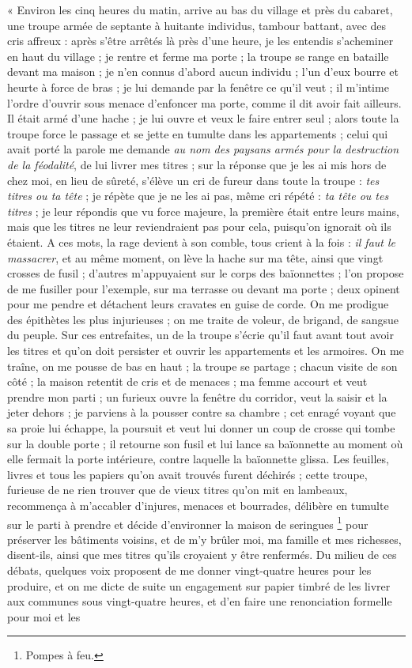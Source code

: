 \documentclass[french,twoside]{book} %
\newenvironment{quoteblock}%
  {\begin{quoting}}
  {\end{quoting}}
\newenvironment{quotebar}{%
    \def\FrameCommand{{\color{rubric!10!}\vrule width 0.5em} \hspace{0.9em}}%
    \def\OuterFrameSep{\itemsep} %
    \MakeFramed {\advance\hsize-\width \FrameRestore}
  }%
  {%
    \endMakeFramed
  }
\renewenvironment{quoteblock}%
  {%
    \savenotes
    \setstretch{0.9}
    \begin{quotebar}
  }
  {%
    \end{quotebar}
    \spewnotes
  }
\begin{document}
\begin{quoteblock}
 \noindent « Environ les cinq heures du matin, arrive au bas du village et près du cabaret, une troupe armée de septante à huitante individus, tambour battant, avec des cris affreux : après s’être arrêtés là près d’une heure, je les entendis s’acheminer en haut du village ; je rentre et ferme ma porte ; la troupe se range en bataille devant ma maison ; je n’en connus d’abord aucun individu ; l’un d’eux bourre et heurte à force de bras ; je lui demande par la fenêtre ce qu’il veut ; il m’intime l’ordre d’ouvrir sous menace d’enfoncer ma porte, comme il dit avoir fait ailleurs. Il était armé d’une hache ; je lui ouvre et veux le faire entrer seul ; alors toute la troupe force le passage et se jette en tumulte dans les appartements ; celui qui avait porté la parole me demande \emph{au nom des paysans armés pour la destruction de la féodalité}, de lui livrer mes titres ; sur la réponse que je les ai mis hors de chez moi, en lieu de sûreté, s’élève un cri de fureur dans toute la troupe : \emph{tes titres ou ta tête} ; je répète que je ne les ai pas, même cri répété : \emph{ta tête ou tes titres} ; je leur répondis que vu force majeure, la première était entre leurs mains, mais que les titres ne leur reviendraient pas pour cela, puisqu’on ignorait où ils étaient. A ces mots, la rage devient à son comble, tous crient à la fois : \emph{il faut le massacrer}, et au même moment, on lève la hache sur ma tête, ainsi que vingt crosses de fusil ; d’autres m’appuyaient sur le corps des baïonnettes ; l’on propose de me fusiller pour l’exemple, sur ma terrasse ou devant ma porte ; deux opinent pour me pendre et détachent leurs cravates en guise de corde. On me prodigue des épithètes les plus injurieuses ; on me traite de voleur, de brigand, de sangsue du peuple. Sur ces entrefaites, un de la troupe s’écrie qu’il faut avant tout avoir les titres et qu’on doit persister et ouvrir les appartements et les armoires. On me traîne, on me pousse de bas en haut ; la troupe se partage ; chacun visite de son côté ; la maison retentit de cris et de menaces ; ma femme accourt et veut prendre mon parti ; un furieux ouvre la fenêtre du corridor, veut la saisir et la jeter dehors ; je parviens à la pousser contre sa chambre ; cet enragé voyant que sa proie lui échappe, la poursuit et veut lui donner un coup de crosse qui tombe sur la double porte ; il retourne son fusil et lui lance sa baïonnette au moment où elle fermait la porte intérieure, contre laquelle la baïonnette glissa. Les feuilles, livres et tous les papiers qu’on avait trouvés furent déchirés ; cette troupe, furieuse de ne rien trouver que de vieux titres qu’on mit en lambeaux, recommença à m’accabler d’injures, menaces et bourrades, délibère en tumulte sur le parti à prendre et décide d’environner la maison de seringues \footnote{Pompes à feu.} pour préserver les bâtiments voisins, et de m’y brûler moi, ma famille et mes richesses, disent-ils, ainsi que mes titres qu’ils croyaient y être renfermés. Du milieu de ces débats, quelques voix proposent de me donner vingt-quatre heures pour les produire, et on me dicte de suite un engagement sur papier timbré de les livrer aux communes sous vingt-quatre heures, et d’en faire une renonciation formelle pour moi et les 
\end{quoteblock}
\end{document}
